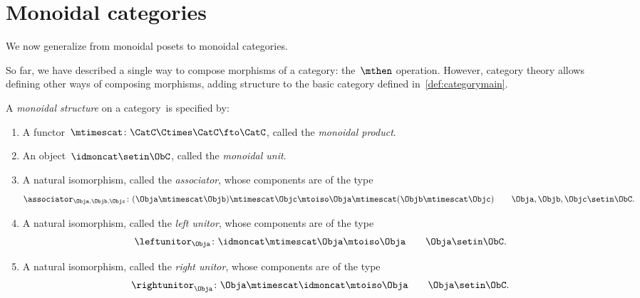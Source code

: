 
\section{Monoidal categories}
\label{sec:parallelism-mon-cat}

We now generalize from monoidal posets to monoidal categories.

So far, we have described a single way to compose morphisms of a category: the~$\mthen$ operation.
However, category theory allows defining other ways of composing morphisms, adding structure to the basic category defined in~\cref{def:categorymain}.

\begin{ctdefinition}
    \label{def:monoidal-cat}
    A \emph{monoidal structure} on a category~\CatC is specified by:

    \constit
    \begin{enumerate}
        \item A functor~$\mtimescat \colon \CatC \Ctimes \CatC\fto \CatC$, called the \emph{monoidal product}.
        \item An object~$\idmoncat \setin \ObC$, called the \emph{monoidal unit}.
        \item A natural isomorphism, called the \emph{associator}, whose components are of the type
              \begin{equation}
                  \associator_{\Obja,\Objb,\Objc}\colon (\Obja \mtimescat \Objb )\mtimescat \Objc \mtoiso \Obja\mtimescat (\Objb \mtimescat \Objc) \quad \quad \Obja,\Objb,\Objc\setin \ObC.
              \end{equation}
        \item A natural isomorphism, called the \emph{left unitor}, whose components are of the type
              \begin{equation}
                  \leftunitor_\Obja \colon \idmoncat\mtimescat \Obja \mtoiso \Obja \quad \quad \Obja\setin \ObC.
              \end{equation}
        \item A natural isomorphism, called the \emph{right unitor}, whose components are of the type
              \begin{equation}
                  \rightunitor_\Obja \colon \Obja \mtimescat \idmoncat \mtoiso \Obja \quad \quad \Obja\setin \ObC.
              \end{equation}
    \end{enumerate}


\end{ctdefinition}
